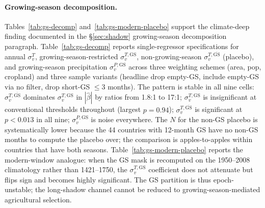 \documentclass[11pt,letterpaper]{article}
\begin{document}
\paragraph{Growing-season decomposition.}
Tables~\ref{tab:gs-decomp} and~\ref{tab:gs-modern-placebo} support the climate-deep finding documented in the §\ref{sec:shadow} growing-season decomposition paragraph. Table~\ref{tab:gs-decomp} reports single-regressor specifications for annual $\sigma_v^T$, growing-season-restricted $\sigma_v^{T,\mathrm{GS}}$, non-growing-season $\sigma_v^{T,\overline{\mathrm{GS}}}$ (placebo), and growing-season precipitation $\sigma_v^{P,\mathrm{GS}}$ across three weighting schemes (area, pop, cropland) and three sample variants (headline drop empty-GS, include empty-GS via no filter, drop short-GS $\le 3$ months). The pattern is stable in all nine cells: $\sigma_v^{T,\overline{\mathrm{GS}}}$ dominates $\sigma_v^{T,\mathrm{GS}}$ in $|\hat\beta|$ by ratios from 1.8:1 to 17:1; $\sigma_v^{T,\mathrm{GS}}$ is insignificant at conventional thresholds throughout (largest $p=0.94$); $\sigma_v^{T,\overline{\mathrm{GS}}}$ is significant at $p<0.013$ in all nine; $\sigma_v^{P,\mathrm{GS}}$ is noise everywhere. The $N$ for the non-GS placebo is systematically lower because the 44 countries with 12-month GS have no non-GS months to compute the placebo over; the comparison is apples-to-apples within countries that have both seasons. Table~\ref{tab:gs-modern-placebo} reports the modern-window analogue: when the GS mask is recomputed on the 1950--2008 climatology rather than 1421--1750, the $\sigma_v^{T,\mathrm{GS}}$ coefficient does not attenuate but flips sign and becomes highly significant. The GS partition is thus epoch-unstable; the long-shadow channel cannot be reduced to growing-season-mediated agricultural selection.
\end{document}
